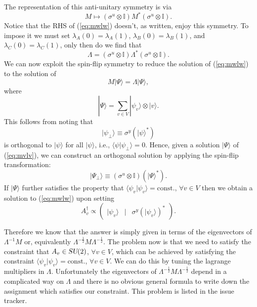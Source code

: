 \documentclass[12pt]{amsart}
\def\su2{\textsl{SU}(2)}
\theoremstyle{definition}
\theoremstyle{remark}
\numberwithin{equation}{section}
\begin{document}
The representation of this anti-unitary symmetry is via 
\begin{equation}
	M \mapsto (\sigma^u\otimes \mathbb{I}) M^* (\sigma^u\otimes \mathbb{I}).
\end{equation}
Notice that the RHS of (\ref{eq:mwlw}) doesn't, as written, enjoy this symmetry. To impose it we must set $\lambda_A(0) = \lambda_A(1)$, $\lambda_B(0) = \lambda_B(1)$, and $\lambda_C(0) = \lambda_C(1)$, only then do we find that
\begin{equation}
	\Lambda = (\sigma^u\otimes \mathbb{I}) \Lambda^* (\sigma^u\otimes \mathbb{I}).
\end{equation}
We can now exploit the spin-flip symmetry to reduce the solution of (\ref{eq:mwlw}) to the solution of 
\begin{equation}\label{eq:mvlv}
	M|\Psi\rangle = \Lambda |\Psi\rangle,
\end{equation}
where
\begin{equation}
	|\Psi\rangle = \sum_{v\in V} |\psi_v\rangle \otimes |v\rangle.
\end{equation}
This follows from noting that 
\begin{equation}
	|\psi_\perp\rangle \equiv \sigma^y (|\psi\rangle^*)
\end{equation}
is orthogonal to $|\psi\rangle$ for all $|\psi\rangle$, i.e., $\langle \psi|\psi_\perp\rangle = 0$. Hence, given a solution $|\Psi\rangle$ of (\ref{eq:mvlv}), we can construct an orthogonal solution by applying the spin-flip transformation:
\begin{equation}
	|\Psi_\perp\rangle \equiv (\sigma^u\otimes \mathbb{I}) (|\Psi\rangle^*).
\end{equation}
If $|\Psi\rangle$ further satisfies the property that $\langle \psi_v|\psi_v\rangle = \text{const.}$, $\forall v\in V$ then we obtain a solution to (\ref{eq:mwlw}) upon setting
\begin{equation}
	A^\dag_v \propto \begin{pmatrix} 
		|\psi_v\rangle &|&\sigma^y(|\psi_v\rangle)^*
	\end{pmatrix}.
\end{equation}

Therefore we know that the answer is simply given in terms of the eigenvectors of $\Lambda^{-1}M$ or, equivalently $\Lambda^{-\frac12}M\Lambda^{-\frac12}$. The problem now is that we need to satisfy the constraint that $A_v \in \su2$, $\forall v\in V$, which can be achieved by satisfying the constraint $\langle\psi_v|\psi_v\rangle = \text{const.}$, $\forall v\in V$. We can do this by tuning the lagrange multipliers in $\Lambda$. Unfortunately the eigenvectors of $\Lambda^{-\frac12}M\Lambda^{-\frac12}$ depend in a complicated way on $\Lambda$ and there is no obvious general formula to write down the assignment which satisfies our constraint.  {\color{red} This problem is listed in the issue tracker.}
\end{document}
